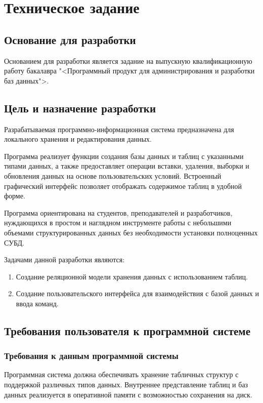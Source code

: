 \section{Техническое задание}
\subsection{Основание для разработки}

Основанием для разработки является задание на выпускную квалификационную работу бакалавра "<Программный продукт для администрирования и разработки баз данных">.

\subsection{Цель и назначение разработки}

Разрабатываемая программно-информационная система предназначена для локального хранения и редактирования данных.

Программа реализует функции создания базы данных и таблиц с указанными типами данных, а также предоставляет операции вставки, удаления, выборки и обновления данных на основе пользовательских условий. Встроенный графический интерфейс позволяет отображать содержимое таблиц в удобной форме.

Программа ориентирована на студентов, преподавателей и разработчиков, нуждающихся в простом и наглядном инструменте работы с небольшими объемами структурированных данных без необходимости установки полноценных СУБД.

Задачами данной разработки являются:
\begin{enumerate}
\item Создание реляционной модели хранения данных с использованием таблиц.
\item Создание пользовательского интерфейса для взаимодействия с базой данных и ввода команд.
\end{enumerate}

\subsection{Требования пользователя к программной системе}

\subsubsection{Требования к данным программной системы}

Программная система должна обеспечивать хранение табличных структур с поддержкой различных типов данных. Внутреннее представление таблиц и баз данных реализуется в оперативной памяти с возможностью сохранения на диск.

